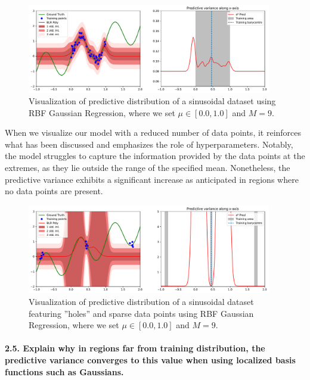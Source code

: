 \begin{figure}[H]
    \centering
    \includegraphics[width=0.95\textwidth]{phi_gaussian.pdf}
    \caption{Visualization of predictive distribution of a sinusoidal dataset using RBF Gaussian Regression, where we set $\mu \in [0.0, 1.0]$ and $M = 9$.}
    \label{fig:phi_gaussian}
\end{figure}

When we visualize our model with a reduced number of data points, it reinforces what has been discussed and emphasizes the role of hyperparameters. Notably, the model struggles to capture the information provided by the data points at the extremes, as they lie outside the range of the specified mean. Nonetheless, the predictive variance exhibits a significant increase as anticipated in regions where no data points are present.

\begin{figure}[H]
    \centering
    \includegraphics[width=0.95\textwidth]{phi_gaussian_hole.pdf}
    \caption{Visualization of predictive distribution of a sinusoidal dataset featuring ''holes'' and sparse data points using RBF Gaussian Regression, where we set $\mu \in [0.0, 1.0]$ and $M = 9$.}
    \label{fig:phi_gaussian_hole}
\end{figure}

\paragraph*{2.5. Explain why in regions far from training distribution, the predictive variance converges to this value when using localized basis functions such as Gaussians.}


